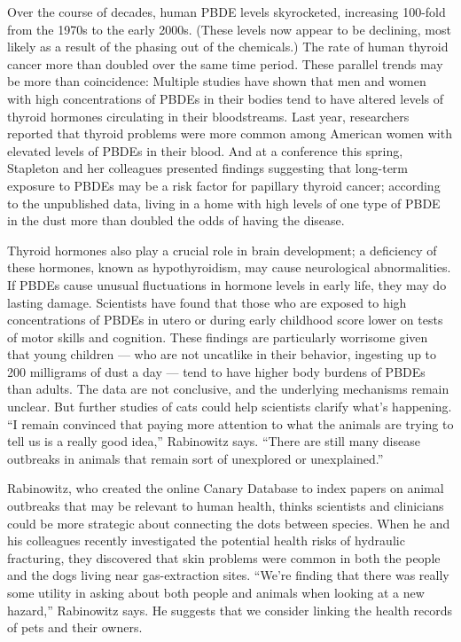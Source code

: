 Over the course of decades, human PBDE levels skyrocketed, increasing
100-fold from the 1970s to the early 2000s. (These levels now appear to
be declining, most likely as a result of the phasing out of the
chemicals.) The rate of human thyroid cancer more than doubled over the
same time period. These parallel trends may be more than coincidence:
Multiple studies have shown that men and women with high concentrations
of PBDEs in their bodies tend to have altered levels of thyroid hormones
circulating in their bloodstreams. Last year, researchers reported that
thyroid problems were more common among American women with elevated
levels of PBDEs in their blood. And at a conference this spring,
Stapleton and her colleagues presented findings suggesting that
long-term exposure to PBDEs may be a risk factor for papillary thyroid
cancer; according to the unpublished data, living in a home with high
levels of one type of PBDE in the dust more than doubled the odds of
having the disease.

Thyroid hormones also play a crucial role in brain development; a
deficiency of these hormones, known as hypothyroidism, may cause
neurological abnormalities. If PBDEs cause unusual fluctuations in
hormone levels in early life, they may do lasting damage. Scientists
have found that those who are exposed to high concentrations of PBDEs in
utero or during early childhood score lower on tests of motor skills and
cognition. These findings are particularly worrisome given that young
children --- who are not uncatlike in their behavior, ingesting up to
200 milligrams of dust a day --- tend to have higher body burdens of
PBDEs than adults. The data are not conclusive, and the underlying
mechanisms remain unclear. But further studies of cats could help
scientists clarify what's happening. ``I remain convinced that paying
more attention to what the animals are trying to tell us is a really
good idea,'' Rabinowitz says. ``There are still many disease outbreaks
in animals that remain sort of unexplored or unexplained.''

Rabinowitz, who created the online Canary Database to index papers on
animal outbreaks that may be relevant to human health, thinks scientists
and clinicians could be more strategic about connecting the dots between
species. When he and his colleagues recently investigated the potential
health risks of hydraulic fracturing, they discovered that skin problems
were common in both the people and the dogs living near gas-extraction
sites. ``We're finding that there was really some utility in asking
about both people and animals when looking at a new hazard,'' Rabinowitz
says. He suggests that we consider linking the health records of pets
and their owners.


